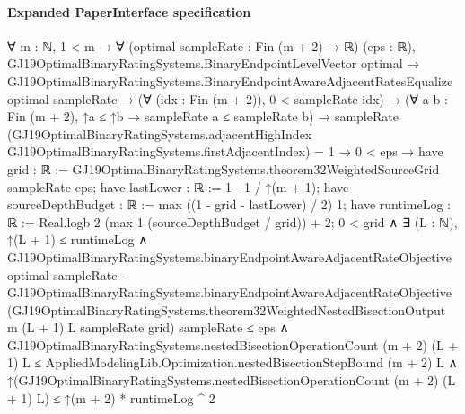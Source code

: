 \documentclass[10pt]{article}
\begin{document}
\paragraph{Expanded PaperInterface specification}
\begin{ReviewVerbatim}
∀ {m : ℕ},
  1 < m →
    ∀ (optimal sampleRate : Fin (m + 2) → ℝ) (eps : ℝ),
      GJ19OptimalBinaryRatingSystems.BinaryEndpointLevelVector optimal →
        GJ19OptimalBinaryRatingSystems.BinaryEndpointAwareAdjacentRatesEqualize optimal sampleRate →
          (∀ (idx : Fin (m + 2)), 0 < sampleRate idx) →
            (∀ {a b : Fin (m + 2)}, ↑a ≤ ↑b → sampleRate a ≤ sampleRate b) →
              sampleRate
                    (GJ19OptimalBinaryRatingSystems.adjacentHighIndex
                      GJ19OptimalBinaryRatingSystems.firstAdjacentIndex) =
                  1 →
                0 < eps →
                  have grid : ℝ := GJ19OptimalBinaryRatingSystems.theorem32WeightedSourceGrid sampleRate eps;
                  have lastLower : ℝ := 1 - 1 / ↑(m + 1);
                  have sourceDepthBudget : ℝ := max ((1 - grid - lastLower) / 2) 1;
                  have runtimeLog : ℝ := Real.logb 2 (max 1 (sourceDepthBudget / grid)) + 2;
                  0 < grid ∧
                    ∃ (L : ℕ),
                      ↑(L + 1) ≤ runtimeLog ∧
                        GJ19OptimalBinaryRatingSystems.binaryEndpointAwareAdjacentRateObjective optimal sampleRate -
                              GJ19OptimalBinaryRatingSystems.binaryEndpointAwareAdjacentRateObjective
                                (GJ19OptimalBinaryRatingSystems.theorem32WeightedNestedBisectionOutput m (L + 1) L
                                  sampleRate grid)
                                sampleRate ≤
                            eps ∧
                          GJ19OptimalBinaryRatingSystems.nestedBisectionOperationCount (m + 2) (L + 1) L ≤
                              AppliedModelingLib.Optimization.nestedBisectionStepBound (m + 2) L ∧
                            ↑(GJ19OptimalBinaryRatingSystems.nestedBisectionOperationCount (m + 2) (L + 1) L) ≤
                              ↑(m + 2) * runtimeLog ^ 2
\end{ReviewVerbatim}
\end{document}
